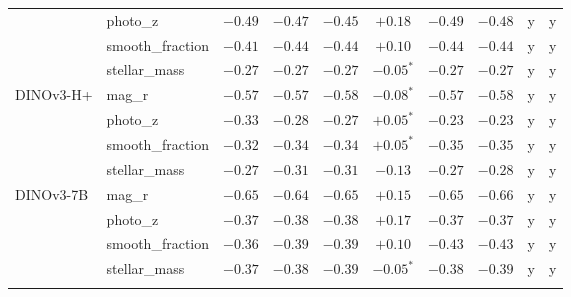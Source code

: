 \begin{tabular}{llcccccccc}
 & photo\_z & $-0.49$ & $-0.47$ & $-0.45$ & $+0.18$ & $-0.49$ & $-0.48$ & y & y \\
 & smooth\_fraction & $-0.41$ & $-0.44$ & $-0.44$ & $+0.10$ & $-0.44$ & $-0.44$ & y & y \\
 & stellar\_mass & $-0.27$ & $-0.27$ & $-0.27$ & $-0.05^{*}$ & $-0.27$ & $-0.27$ & y & y \\
\addlinespace[2pt]
DINOv3-H+ & mag\_r & $-0.57$ & $-0.57$ & $-0.58$ & $-0.08^{*}$ & $-0.57$ & $-0.58$ & y & y \\
 & photo\_z & $-0.33$ & $-0.28$ & $-0.27$ & $+0.05^{*}$ & $-0.23$ & $-0.23$ & y & y \\
 & smooth\_fraction & $-0.32$ & $-0.34$ & $-0.34$ & $+0.05^{*}$ & $-0.35$ & $-0.35$ & y & y \\
 & stellar\_mass & $-0.27$ & $-0.31$ & $-0.31$ & $-0.13$ & $-0.27$ & $-0.28$ & y & y \\
\addlinespace[2pt]
DINOv3-7B & mag\_r & $-0.65$ & $-0.64$ & $-0.65$ & $+0.15$ & $-0.65$ & $-0.66$ & y & y \\
 & photo\_z & $-0.37$ & $-0.38$ & $-0.38$ & $+0.17$ & $-0.37$ & $-0.37$ & y & y \\
 & smooth\_fraction & $-0.36$ & $-0.39$ & $-0.39$ & $+0.10$ & $-0.43$ & $-0.43$ & y & y \\
 & stellar\_mass & $-0.37$ & $-0.38$ & $-0.39$ & $-0.05^{*}$ & $-0.38$ & $-0.39$ & y & y \\
\addlinespace[2pt]
\bottomrule
\end{tabular}
